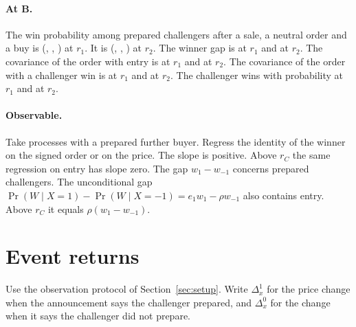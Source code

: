 \documentclass[12pt]{article}
\theoremstyle{definition}
\begin{document}
\paragraph{At B.}
The win probability among prepared challengers after a sale, a neutral order and a buy is (, , ) at $r_1$.
It is (, , ) at $r_2$.
The winner gap is  at $r_1$ and  at $r_2$.
The covariance of the order with entry is  at $r_1$ and  at $r_2$.
The covariance of the order with a challenger win is  at $r_1$ and  at $r_2$.
The challenger wins with probability  at $r_1$ and  at $r_2$.

\paragraph{Observable.}
Take processes with a prepared further buyer.
Regress the identity of the winner on the signed order or on the price.
The slope is positive.
Above $r_C$ the same regression on entry has slope zero.
The gap $w_1-w_{-1}$ concerns prepared challengers.
The unconditional gap $\Pr(W\mid X=1)-\Pr(W\mid X=-1)=e_1w_1-\rho w_{-1}$ also contains entry.
Above $r_C$ it equals $\rho(w_1-w_{-1})$.

\section{Event returns}\label{sec:event}

Use the observation protocol of Section~\ref{sec:setup}.
Write $\Delta^1_x$ for the price change when the announcement says the challenger prepared, and $\Delta^0_x$ for the change when it says the challenger did not prepare.
\end{document}
